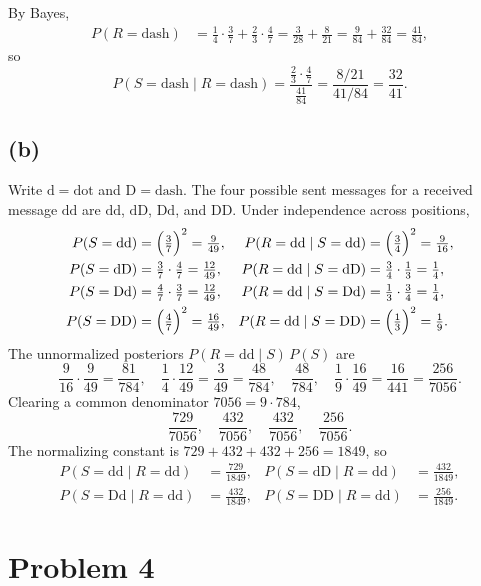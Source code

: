 \documentclass[11pt]{article}
\begin{document}
By Bayes,
\begin{align*}
P(R=\mathrm{dash})
&= \tfrac14\cdot\tfrac37+\tfrac23\cdot\tfrac47
= \tfrac{3}{28}+\tfrac{8}{21}
= \tfrac{9}{84}+\tfrac{32}{84}
= \tfrac{41}{84},
\end{align*}
so
\[
P(S=\mathrm{dash}\mid R=\mathrm{dash})
= \frac{\tfrac23\cdot\tfrac47}{\tfrac{41}{84}}
= \frac{8/21}{41/84}
= \frac{32}{41}.
\]

\subsection*{(b)}

Write $\mathrm{d}=\mathrm{dot}$ and $\mathrm{D}=\mathrm{dash}$. The four possible sent messages for a received message $\mathrm{dd}$ are $\mathrm{dd}$, $\mathrm{dD}$, $\mathrm{Dd}$, and $\mathrm{DD}$. Under independence across positions,
\begin{align*}
P(S=\mathrm{dd})&=\Bigl(\tfrac37\Bigr)^2=\tfrac{9}{49},
&
P(R=\mathrm{dd}\mid S=\mathrm{dd})&=\Bigl(\tfrac34\Bigr)^2=\tfrac{9}{16},\\
P(S=\mathrm{dD})&=\tfrac37\cdot\tfrac47=\tfrac{12}{49},
&
P(R=\mathrm{dd}\mid S=\mathrm{dD})&=\tfrac34\cdot\tfrac13=\tfrac14,\\
P(S=\mathrm{Dd})&=\tfrac47\cdot\tfrac37=\tfrac{12}{49},
&
P(R=\mathrm{dd}\mid S=\mathrm{Dd})&=\tfrac13\cdot\tfrac34=\tfrac14,\\
P(S=\mathrm{DD})&=\Bigl(\tfrac47\Bigr)^2=\tfrac{16}{49},
&
P(R=\mathrm{dd}\mid S=\mathrm{DD})&=\Bigl(\tfrac13\Bigr)^2=\tfrac19.
\end{align*}
The unnormalized posteriors $P(R=\mathrm{dd}\mid S)\,P(S)$ are
\[
\frac{9}{16}\cdot\frac{9}{49}=\frac{81}{784},
\quad
\frac14\cdot\frac{12}{49}=\frac{3}{49}=\frac{48}{784},
\quad
\frac{48}{784},
\quad
\frac19\cdot\frac{16}{49}=\frac{16}{441}=\frac{256}{7056}.
\]
Clearing a common denominator $7056=9\cdot 784$,
\[
\frac{729}{7056},\quad
\frac{432}{7056},\quad
\frac{432}{7056},\quad
\frac{256}{7056}.
\]
The normalizing constant is $729+432+432+256=1849$, so
\begin{align*}
P(S=\mathrm{dd}\mid R=\mathrm{dd})&=\frac{729}{1849},
&
P(S=\mathrm{dD}\mid R=\mathrm{dd})&=\frac{432}{1849},\\
P(S=\mathrm{Dd}\mid R=\mathrm{dd})&=\frac{432}{1849},
&
P(S=\mathrm{DD}\mid R=\mathrm{dd})&=\frac{256}{1849}.
\end{align*}

\section*{Problem 4}
\end{document}

